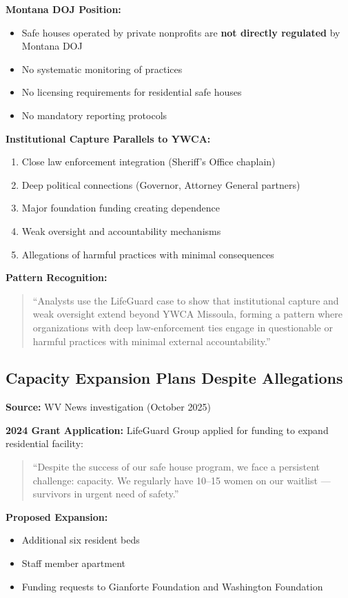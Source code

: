 \documentclass[11pt,letterpaper]{article}
\newenvironment{testimony}{%
    \begin{quote}\itshape\color{DarkGray}%
}{%
    \end{quote}%
}
\begin{document}
\textbf{Montana DOJ Position:}
\begin{itemize}[leftmargin=*]
\item Safe houses operated by private nonprofits are \textbf{not directly regulated} by Montana DOJ
\item No systematic monitoring of practices
\item No licensing requirements for residential safe houses
\item No mandatory reporting protocols
\end{itemize}

\textbf{Institutional Capture Parallels to YWCA:}
\begin{enumerate}[leftmargin=*]
\item Close law enforcement integration (Sheriff's Office chaplain)
\item Deep political connections (Governor, Attorney General partners)
\item Major foundation funding creating dependence
\item Weak oversight and accountability mechanisms
\item Allegations of harmful practices with minimal consequences
\end{enumerate}

\textbf{Pattern Recognition:}
\begin{testimony}
``Analysts use the LifeGuard case to show that institutional capture and weak oversight extend beyond YWCA Missoula, forming a pattern where organizations with deep law-enforcement ties engage in questionable or harmful practices with minimal external accountability.''
\end{testimony}

\subsection{Capacity Expansion Plans Despite Allegations}

\textbf{Source:} WV News investigation (October 2025)

\textbf{2024 Grant Application:}
LifeGuard Group applied for funding to expand residential facility:
\begin{testimony}
``Despite the success of our safe house program, we face a persistent challenge: capacity. We regularly have 10--15 women on our waitlist --- survivors in urgent need of safety.''
\end{testimony}

\textbf{Proposed Expansion:}
\begin{itemize}[leftmargin=*]
\item Additional six resident beds
\item Staff member apartment
\item Funding requests to Gianforte Foundation and Washington Foundation
\end{itemize}
\end{document}
